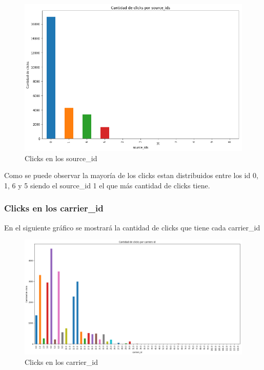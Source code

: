 \documentclass[a4paper, 12pt]{article}
\begin{document}
		\begin{figure}[H]
			\centering
			\includegraphics[width=\textwidth]{images/clicks/clicks_source_id.png}
			\caption{Clicks en los source\_id}
		\end{figure}
		

		 Como se puede observar la mayoría de los clicks estan distribuidos entre los id 0, 1, 6 y 5 siendo el source\_id 1 el que más cantidad de clicks tiene.


	\subsubsection{Clicks en los carrier\_id}
		 En el siguiente gráfico se mostrará la cantidad de clicks que tiene cada carrier\_id
		
		
		\begin{figure}[H]
			\centering
			\includegraphics[width=\textwidth]{images/clicks/clicks_carrier_id.png}
			\caption{Clicks en los carrier\_id}
		\end{figure}
		
\end{document}
